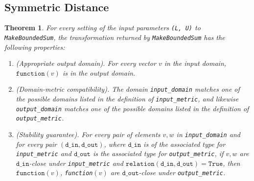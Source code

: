 \documentclass[11pt,a4paper]{article}
\newtheorem{theorem}{Theorem}
\theoremstyle{definition}
\newcommand{\din}{\texttt{d\_in}}
\newcommand{\dout}{\texttt{d\_out}}
\newcommand{\True}{\texttt{True}}
\newcommand{\function}{\texttt{function}}
\begin{document}
\subsection{Symmetric Distance}
\begin{theorem}
    For every setting of the input parameters \texttt{(L, U)} to \texttt{MakeBoundedSum}, the transformation returned by \texttt{MakeBoundedSum} has the following properties:
    \begin{enumerate}
        \item \textup{(Appropriate output domain).} For every vector $v$ in the input domain, $\function(v)$ is in the output domain.
        
        \item \textup{(Domain-metric compatibility).} The domain \texttt{input\_domain} matches one of the possible domains listed in the definition of \texttt{input\_metric}, and likewise \texttt{output\_domain} matches one of the possible domains listed in the definition of \texttt{output\_metric}.
        
        \item \textup{(Stability guarantee).} For every pair of elements $v, w$ in \texttt{input\_domain} and for every pair $(\din, \dout)$,  where $\din$ is of the associated type for \texttt{input\_metric} and $\dout$ is the associated type for \texttt{output\_metric}, if $v,w$ are $\din$-close under \texttt{input\_metric} and $\texttt{relation}(\din, \dout) = \True$, then $\function(v)$, \texttt{function}$(v)$ are $\dout$-close under \texttt{output\_metric}.
    \end{enumerate}
\end{theorem}
\end{document}
